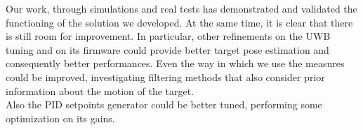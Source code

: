Our work, through simulations and real tests has demonstrated and validated the functioning of the solution we developed. At the same time, it is clear that there is still room for improvement. In particular, other refinements on the UWB tuning and on its firmware could provide better target pose estimation and consequently better performances. Even the way in which we use the measures could be improved, investigating filtering methods that also consider prior information about the motion of the target. \\
Also the PID setpoints generator could be better tuned, performing some optimization on its gains. 